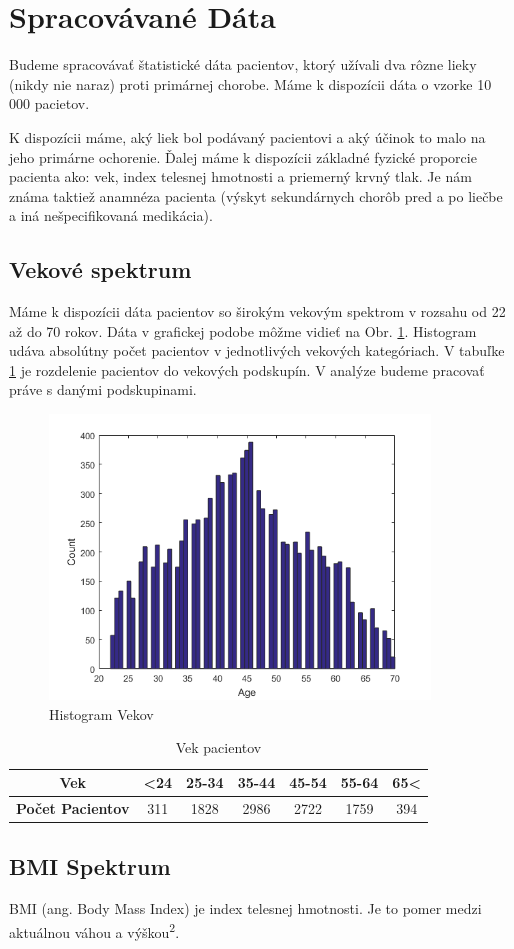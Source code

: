 \section{Spracovávané Dáta}

Budeme spracovávať štatistické dáta pacientov, ktorý užívali dva rôzne lieky (nikdy nie naraz) proti primárnej chorobe. Máme k dispozícii dáta o vzorke 10 000 pacietov.


K dispozícii máme, aký liek bol podávaný pacientovi a aký účinok to malo na jeho primárne ochorenie. Ďalej máme k dispozícii základné fyzické proporcie pacienta ako: vek, index telesnej hmotnosti a priemerný krvný tlak. Je nám známa taktiež anamnéza pacienta (výskyt sekundárnych chorôb pred a po liečbe a iná nešpecifikovaná medikácia).

\subsection{Vekové spektrum}

Máme k dispozícii dáta pacientov so širokým vekovým spektrom v rozsahu od 22 až do 70 rokov. Dáta v grafickej podobe môžme vidieť na Obr. \ref{fig:hist-vek}. Histogram udáva absolútny počet pacientov v jednotlivých vekových kategóriach. V tabuľke \ref{tab:vek} je rozdelenie pacientov do vekových podskupín. V analýze budeme pracovať práve s danými podskupinami.

\begin{figure}[h!]
	\centering
  		\includegraphics[width=0.9\textwidth]{ages.png}
  	\caption{Histogram Vekov}
  	\label{fig:hist-vek}
\end{figure}

\begin{table}[h!]
\centering
\label{vek}
\begin{tabular}{c|cccccc}
\hline
\textbf{Vek}             & \textless 24 & 25-34 & 35-44 & 45-54 & 55-64 & 65\textless \\ \hline
\textbf{Počet Pacientov} & 311 & 1828  & 2986  & 2722  & 1759  & 394 \\ \hline
\end{tabular}
\caption{Vek pacientov}
\label{tab:vek}
\end{table}

\subsection{BMI Spektrum}

BMI (ang. Body Mass Index) je index telesnej hmotnosti. Je to pomer medzi aktuálnou váhou a výškou\textsuperscript 2.